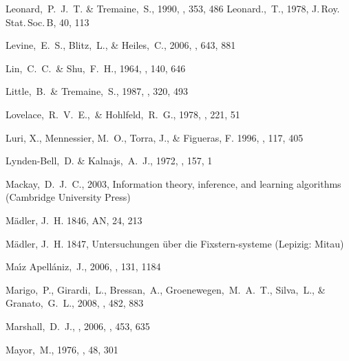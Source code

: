 \begin{thebibliography}{99}
  Leonard,~P.~J.~T. \& Tremaine,~S., 1990,
  \apj, 353, 486
  Leonard.,~T., 1978,
  J.\,Roy.\,Stat.\,Soc.\,B, 40, 113

  Levine,~E.~S., Blitz,~L., \& Heiles,~C., 2006, \apj, 643, 881

  Lin,~C.~C.~\& Shu,~F.~H., 1964,
  \apj, 140, 646

  Little,~B.~\& Tremaine,~S., 1987,
  \apj, 320, 493

  Lovelace,~R.~V.~E.,~\& Hohlfeld,~R.~G., 1978,
  \apj, 221, 51

{Luri}, X., {Mennessier}, M.~O., {Torra}, J., \& {Figueras}, F. 1996, \aaps,
  117, 405

  Lynden-Bell,~D. \& Kalnajs,~A.~J., 1972,
  \mnras, 157, 1

  Mackay,~D.~J.~C., 2003,
  Information theory, inference, and learning algorithms (Cambridge University Press)

{M{\"a}dler}, J.~H. 1846, AN, 24, 213

{M{\"a}dler}, J.~H. 1847, {Untersuchungen {\"u}ber die Fixstern-systeme}
  (Lepizig: Mitau)

  Ma{\'{\i}}z Apell{\'a}niz,~J., 2006,
  \aj, 131, 1184

  Marigo,~P., Girardi,~L., Bressan,~A., Groenewegen,~M.~A.~T., Silva,~L., \& Granato,~G.~L., 2008,
  \aap, 482, 883

  Marshall,~D.~J., \etal, 2006,
  \aap, 453, 635

  Mayor,~M., 1976,
  \aap, 48, 301


\end{thebibliography}
